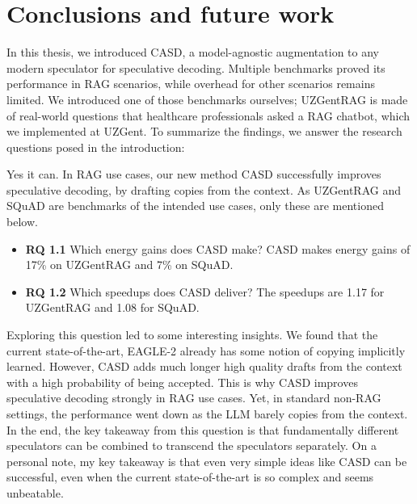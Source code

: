 
\chapter{Conclusions and future work}
\label{sec:conclusion_future_work}

In this thesis, we introduced CASD, a model-agnostic augmentation to any modern speculator for speculative decoding. Multiple benchmarks proved its performance in RAG scenarios, while overhead for other scenarios remains limited. We introduced one of those benchmarks ourselves; UZGentRAG is made of real-world questions that healthcare professionals asked a RAG chatbot, which we implemented at UZGent. To summarize the findings, we answer the research questions posed in the introduction:

\begin{tcolorbox}[colback=blue-ish-light,colframe=blue-ish,title=\textbf{RQ1:} {{Can a new speculative decoding strategy be designed, relying on the repetition of phrases in prompt and answer, resulting in increased inference efficiency of LLMs?}}, coltitle=white]
    Yes it can. In RAG use cases, our new method CASD successfully improves speculative decoding, by drafting copies from the context. As UZGentRAG and SQuAD are benchmarks of the intended use cases, only these are mentioned below.
    \begin{itemize}
        \item \textbf{RQ 1.1} Which energy gains does CASD make? CASD makes energy gains of 17\% on UZGentRAG and 7\% on SQuAD.
        \item \textbf{RQ 1.2} Which speedups does CASD deliver? The speedups are 1.17 for UZGentRAG and 1.08 for SQuAD.
    \end{itemize}
\end{tcolorbox}

Exploring this question led to some interesting insights. We found that the current state-of-the-art, EAGLE-2 already has some notion of copying implicitly learned. However, CASD adds much longer high quality drafts from the context with a high probability of being accepted. This is why CASD improves speculative decoding strongly in RAG use cases. Yet, in standard non-RAG settings, the performance went down as the LLM barely copies from the context. In the end, the key takeaway from this question is that fundamentally different speculators can be combined to transcend the speculators separately. On a personal note, my key takeaway is that even very simple ideas like CASD can be successful, even when the current state-of-the-art is so complex and seems unbeatable. 

